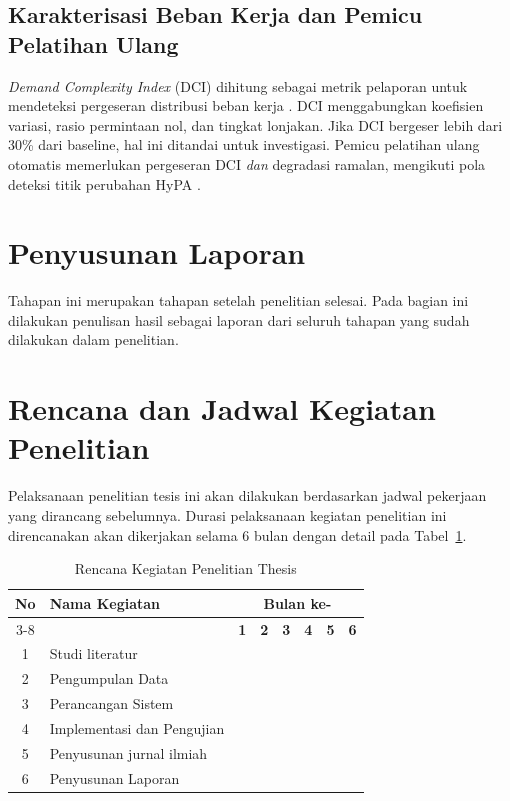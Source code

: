 \subsection{Karakterisasi Beban Kerja dan Pemicu Pelatihan Ulang}

\emph{Demand Complexity Index} (DCI) dihitung sebagai metrik pelaporan untuk mendeteksi pergeseran distribusi beban kerja \citep{dci2025}. DCI menggabungkan koefisien variasi, rasio permintaan nol, dan tingkat lonjakan. Jika DCI bergeser lebih dari 30\% dari baseline, hal ini ditandai untuk investigasi. Pemicu pelatihan ulang otomatis memerlukan pergeseran DCI \emph{dan} degradasi ramalan, mengikuti pola deteksi titik perubahan HyPA \citep{hypa2023}.

\section{Penyusunan Laporan}
\label{sec:penyusunan-laporan}

Tahapan ini merupakan tahapan setelah penelitian selesai. Pada bagian ini dilakukan penulisan hasil sebagai laporan dari seluruh tahapan yang sudah dilakukan dalam penelitian.

\section{Rencana dan Jadwal Kegiatan Penelitian}
\label{sec:jadwal-penelitian}

Pelaksanaan penelitian tesis ini akan dilakukan berdasarkan jadwal pekerjaan yang dirancang sebelumnya. Durasi pelaksanaan kegiatan penelitian ini direncanakan akan dikerjakan selama 6 bulan dengan detail pada Tabel~\ref{tab:jadwal-penelitian}.

\begin{table}[htbp]
    \centering
    \caption{Rencana Kegiatan Penelitian Thesis}
    \label{tab:jadwal-penelitian}
    \small
    \begin{tabular}{c p{4.5cm} c c c c c c}
        \toprule
        \textbf{No} & \textbf{Nama Kegiatan} & \multicolumn{6}{c}{\textbf{Bulan ke-}} \\
        \cmidrule(lr){3-8}
        & & \textbf{1} & \textbf{2} & \textbf{3} & \textbf{4} & \textbf{5} & \textbf{6} \\
        \midrule
        1 & Studi literatur & & & & & & \\
        2 & Pengumpulan Data & & & & & & \\
        3 & Perancangan Sistem & & & & & & \\
        4 & Implementasi dan Pengujian & & & & & & \\
        5 & Penyusunan jurnal ilmiah & & & & & & \\
        6 & Penyusunan Laporan & & & & & & \\
        \bottomrule
    \end{tabular}
\end{table}
